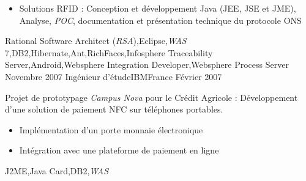 \begin{experiences}
{\begin{itemize}
\begin{itemize}
                          \item Conception et développement JEE
                          \item Définition et implémentation des processus métiers et médiations
                        \end{itemize}
                        \item Solutions RFID : Conception et développement Java (JEE, JSE et JME), Analyse, \emph{POC}, documentation et présentation technique du protocole ONS
                      \end{itemize}
                    }
                    {Rational Software Architect (\emph{RSA}),Eclipse,\emph{WAS} 7,DB2,Hibernate,Ant,RichFaces,Infosphere Traceability Server,Android,Websphere Integration Developer,Websphere Process Server}
  \emptySeparator         
  \experience
  {Novembre 2007}  {Ingénieur d'étude}{IBM}{France}
  {Février 2007}   {
                      Projet de prototypage \emph{Campus Nova} pour le Crédit Agricole : Développement d'une solution de paiement NFC sur téléphones portables.  
                      \begin{itemize}
                        \item Implémentation d'un porte monnaie électronique                                            
                        \item Intégration avec une plateforme de paiement en ligne  
                      \end{itemize}
                  }
                  {J2ME,Java Card,DB2,\emph{WAS}}  
\end{experiences}
